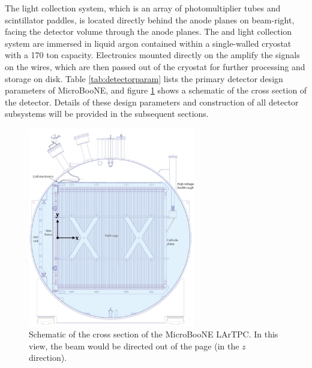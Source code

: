 The light collection system, which is an array of photomultiplier tubes and scintillator paddles, is located directly behind the anode planes on beam-right, facing the detector volume through the anode planes.  The \lartpc and light collection system are immersed in liquid argon contained within a single-walled cryostat with a 170 ton capacity.  Electronics mounted directly on the \lartpc amplify the signals on the wires, which are then passed out of the cryostat for further processing and storage on disk.  Table \ref{tab:detectorparam} lists the primary detector design parameters of MicroBooNE, and figure \ref{fig:microboonetpc} shows a schematic of the cross section of the detector. Details of these design parameters and construction of all detector subsystems will be provided in the subsequent sections.

\begin{figure}
\centering 
\includegraphics[width=0.65\textwidth]{figures/microboone_tpc_diagram.jpg}
\caption{Schematic of the cross section of the MicroBooNE LArTPC.  In this view, the beam would be directed out of the page (in the $z$ direction).}
\label{fig:microboonetpc}
\end{figure}




